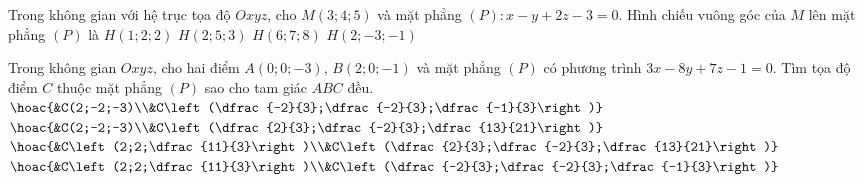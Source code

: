 \begin{ex}%
	Trong không gian với hệ trục tọa độ $Oxyz$, cho $M (3;4;5)$ và mặt phẳng $(P): x-y+2z-3=0$. Hình chiếu vuông góc của $M$ lên mặt phẳng $(P)$ là
	\choice 
	{$H(1;2;2)$}
	{\True $H(2;5;3)$}
	{$H(6;7;8)$}
	{$H(2;-3;-1)$}
\end{ex}
\begin{ex}%
	Trong không gian $Oxyz$, cho hai điểm $A(0;0;-3)$, $B(2;0;-1)$ và mặt phẳng $(P)$ có phương trình $3x-8y+7z-1=0$. Tìm tọa độ điểm $C$ thuộc mặt phẳng $(P)$ sao cho tam giác $ABC$ đều.
	\choice
	{\True $\hoac{&C(2;-2;-3)\\&C\left(\dfrac{-2}{3};\dfrac{-2}{3};\dfrac{-1}{3}\right)}$}
	{$\hoac{&C(2;-2;-3)\\&C\left(\dfrac{2}{3};\dfrac{-2}{3};\dfrac{13}{21}\right)}$}
	{$\hoac{&C\left(2;2;\dfrac{11}{3}\right)\\&C\left(\dfrac{2}{3};\dfrac{-2}{3};\dfrac{13}{21}\right)}$}
	{$\hoac{&C\left(2;2;\dfrac{11}{3}\right)\\&C\left(\dfrac{-2}{3};\dfrac{-2}{3};\dfrac{-1}{3}\right)}$}
\end{ex}

